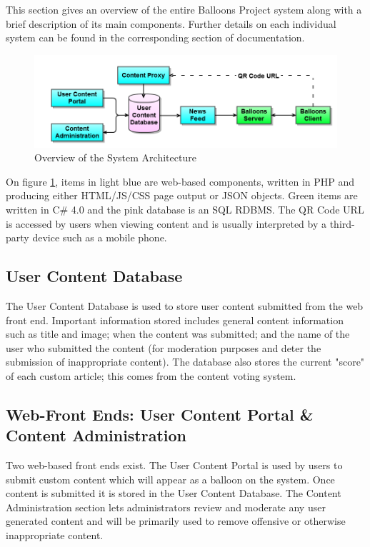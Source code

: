 This section gives an overview of the entire Balloons Project system along
with a brief description of its main components. Further details on each 
individual system can be found in the corresponding section of documentation.

\begin{figure}[h]
\begin{centering}
\includegraphics[width=\textwidth]{Diagrams/System-Architecture-Diagram.png}
\par\end{centering}

\caption{Overview of the System Architecture}
\label{Flo:SystemArch}
\end{figure}

On figure \ref{Flo:SystemArch}, items in light blue are web-based components, written in PHP and producing 
either HTML/JS/CSS page output or JSON objects. Green items are written in C\#
4.0 and the pink database is an SQL RDBMS. The QR Code URL is accessed by users
when viewing content and is usually interpreted by a third-party device such as
a mobile phone.

\subsection{User Content Database}
The User Content Database is used to store user content submitted from the web
front end. Important information stored includes general content information 
such as title and image; when the content was submitted; and the name of the 
user who submitted the content (for moderation purposes and deter the 
submission of inappropriate content). The database also stores the current 
"score" of each custom article; this comes from the content voting system. 

\subsection{Web-Front Ends: User Content Portal \& Content Administration}
Two web-based front ends exist. The User Content Portal is used by users to 
submit custom content which will appear as a balloon on the system. Once 
content is submitted it is stored in the User Content Database. The Content
Administration section lets administrators review and moderate any user 
generated content and will be primarily used to remove offensive or otherwise
inappropriate content.

